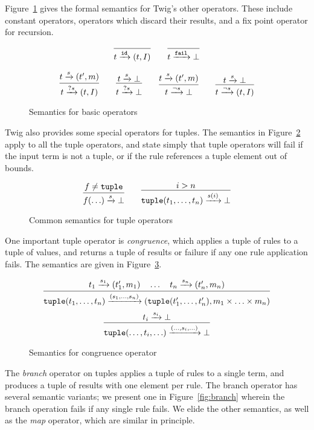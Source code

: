 Figure~\ref{fig:basic} gives the formal semantics for Twig's other operators. These include constant operators, operators which discard their results, and a fix point operator for recursion.

\begin{figure}[ht]
\label{fig:basic}
\[
\infer
  {t \arr{\mathtt{id}} (t,I)}
  {}
\qquad
\infer
  {t \arr{\mathtt{fail}} \bot}
  {}
\]

\[
\infer
  {t \arr{?s} (t,I)}
  {t \arr{s} (t',m)}
\qquad 
\infer
  {t \arr{?s} \bot}
  {t \arr{s} \bot}
\qquad
\infer
  {t \arr{\lnot s} \bot}
  {t \arr{s} (t',m)}
\qquad 
\infer
  {t \arr{\lnot s} (t,I)}
  {t \arr{s} \bot}
\]


\caption{Semantics for basic operators}
\end{figure}

Twig also provides some special operators for tuples. The semantics in Figure~\ref{fig:all-tuples} apply to all the tuple operators, and state simply that tuple operators will fail if the input term is not a tuple, or if the rule references a tuple element out of bounds.

\begin{figure}[ht]
\label{fig:all-tuples}
\[
\infer
  {f(\ldots) \arr{s} \bot}
  {f \neq \mathtt{tuple}}
\qquad
\infer
  {\mathtt{tuple}(t_1,\ldots,t_n) \arr{s(i)} \bot}
  {i > n}
\]
\caption{Common semantics for tuple operators}
\end{figure}

One important tuple operator is \emph{congruence}, which applies a tuple of rules to a tuple of values, and returns a tuple of results or failure if any one rule application fails. The semantics are given in Figure~\ref{fig:congruence}.

\begin{figure}[ht]
\label{fig:congruence}
\[
\infer
  {\mathtt{tuple}(t_1,\ldots,t_n)\arr{(s_1,\ldots,s_n)} (\mathtt{tuple}(t_1',\ldots,t_n'),m_1 \times \ldots \times m_n) }
  {t_1 \arr{s_1} (t_1',m_1) \quad \ldots \quad t_n \arr{s_n} (t_n',m_n)}
\]
\[
\infer
  {\mathtt{tuple}(\ldots,t_i,\ldots)\arr{(\ldots,s_i,\ldots)}\bot}
  {t_i \arr{s_i} \bot}
\]
\caption{Semantics for congruence operator}
\end{figure}

The \emph{branch} operator on tuples applies a tuple of rules to a single term, and produces a tuple of results with one element per rule. The branch operator has several semantic variants; we present one in Figure~\ref{fig:branch} wherein the branch operation fails if any single rule fails. We elide the other semantics, as well as the \emph{map} operator, which are similar in principle.

